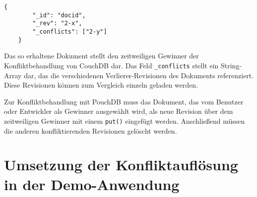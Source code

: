 \begin{codebox}
	\begin{lstlisting}[style=typescript]
	{
		"_id": "docid",
		"_rev": "2-x",
		"_conflicts": ["2-y"]
	}
	\end{lstlisting}
\end{codebox}

Das so erhaltene Dokument stellt den zeitweiligen Gewinner der Konfliktbehandlung von CouchDB dar.
Das Feld \texttt{\_conflicts} stellt ein String-Array dar, das die verschiedenen Verlierer-Revisionen des Dokuments referenziert. Diese Revisionen können zum Vergleich einzeln geladen werden.

Zur Konfliktbehandlung mit PouchDB muss das Dokument, das vom Benutzer oder Entwickler als Gewinner ausgewählt wird, als neue Revision über dem zeitweiligen Gewinner mit einem \texttt{put()} eingefügt werden. Anschließend müssen die anderen konfliktierenden Revisionen gelöscht werden.

\section{Umsetzung der Konfliktauflösung in der Demo-Anwendung}